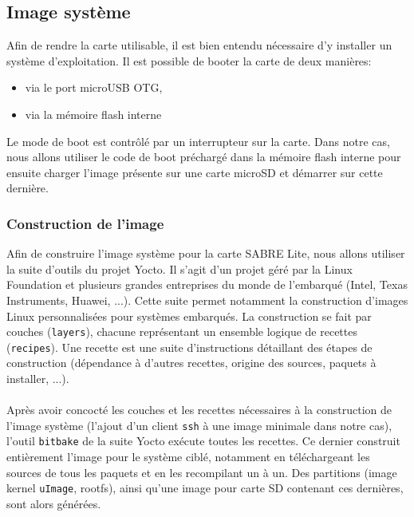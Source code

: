 \subsection{Image système}
Afin de rendre la carte utilisable, il est bien entendu nécessaire d'y installer
un système d'exploitation. Il est possible de booter la carte de deux manières:
\begin{itemize}
\renewcommand{\labelitemi}{$\bullet$}
\item via le port microUSB OTG,
\item via la mémoire flash interne
\end{itemize}
Le mode de boot est contrôlé par un interrupteur sur la carte. Dans notre cas,
nous allons utiliser le code de boot préchargé dans la mémoire flash interne
pour ensuite charger l'image présente sur une carte microSD et démarrer sur
cette dernière.

\subsubsection{Construction de l'image}
Afin de construire l'image système pour la carte SABRE Lite, nous allons
utiliser la suite d'outils du projet Yocto\cite{hallinan_create_2015}. Il s'agit
d'un projet géré par la Linux Foundation et plusieurs grandes entreprises du
monde de l'embarqué (Intel, Texas Instruments, Huawei, ...). Cette suite permet
notamment la construction d'images Linux personnalisées pour systèmes embarqués.
La construction se fait par couches (\texttt{layers}), chacune représentant un
ensemble logique de recettes (\texttt{recipes}). Une recette est une suite
d'instructions détaillant des étapes de construction (dépendance à d'autres
recettes, origine des sources, paquets à installer, ...).

\paragraph{} Après avoir concocté les couches et les recettes nécessaires à la
construction de l'image système (l'ajout d'un client \texttt{ssh} à une image
minimale dans notre cas), l'outil \texttt{bitbake}\cite{purdie_bitbake_????}
de la suite Yocto exécute toutes les recettes. Ce dernier construit entièrement
l'image pour le système ciblé, notamment en téléchargeant les sources de tous
les paquets et en les recompilant un à un. Des partitions (image kernel
\texttt{uImage}, rootfs), ainsi qu'une image pour carte SD contenant ces
dernières, sont alors générées.

